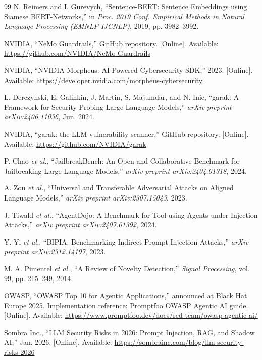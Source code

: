 \documentclass[journal]{IEEEtran}
\begin{document}
\begin{thebibliography}{99}
N. Reimers and I. Gurevych, ``Sentence-BERT: Sentence Embeddings using Siamese BERT-Networks,'' in \textit{Proc. 2019 Conf. Empirical Methods in Natural Language Processing (EMNLP-IJCNLP)}, 2019, pp. 3982--3992.

NVIDIA, ``NeMo Guardrails,'' GitHub repository. [Online]. Available: \url{https://github.com/NVIDIA/NeMo-Guardrails}

NVIDIA, ``NVIDIA Morpheus: AI-Powered Cybersecurity SDK,'' 2023. [Online]. Available: \url{https://developer.nvidia.com/morpheus-cybersecurity}

L. Derczynski, E. Galinkin, J. Martin, S. Majumdar, and N. Inie, ``garak: A Framework for Security Probing Large Language Models,'' \textit{arXiv preprint arXiv:2406.11036}, Jun. 2024.

NVIDIA, ``garak: the LLM vulnerability scanner,'' GitHub repository. [Online]. Available: \url{https://github.com/NVIDIA/garak}

P. Chao \textit{et al.}, ``JailbreakBench: An Open and Collaborative Benchmark for Jailbreaking Large Language Models,'' \textit{arXiv preprint arXiv:2404.01318}, 2024.

A. Zou \textit{et al.}, ``Universal and Transferable Adversarial Attacks on Aligned Language Models,'' \textit{arXiv preprint arXiv:2307.15043}, 2023.

J. Tiwald \textit{et al.}, ``AgentDojo: A Benchmark for Tool-using Agents under Injection Attacks,'' \textit{arXiv preprint arXiv:2407.01392}, 2024.

Y. Yi \textit{et al.}, ``BIPIA: Benchmarking Indirect Prompt Injection Attacks,'' \textit{arXiv preprint arXiv:2312.14197}, 2023.

M. A. Pimentel \textit{et al.}, ``A Review of Novelty Detection,'' \textit{Signal Processing}, vol. 99, pp. 215--249, 2014.

OWASP, ``OWASP Top 10 for Agentic Applications,'' announced at Black Hat Europe 2025. Implementation reference: Promptfoo OWASP Agentic AI guide. [Online]. Available: \url{https://www.promptfoo.dev/docs/red-team/owasp-agentic-ai/}

Sombra Inc., ``LLM Security Risks in 2026: Prompt Injection, RAG, and Shadow AI,'' Jan. 2026. [Online]. Available: \url{https://sombrainc.com/blog/llm-security-risks-2026}


\end{thebibliography}
\end{document}
